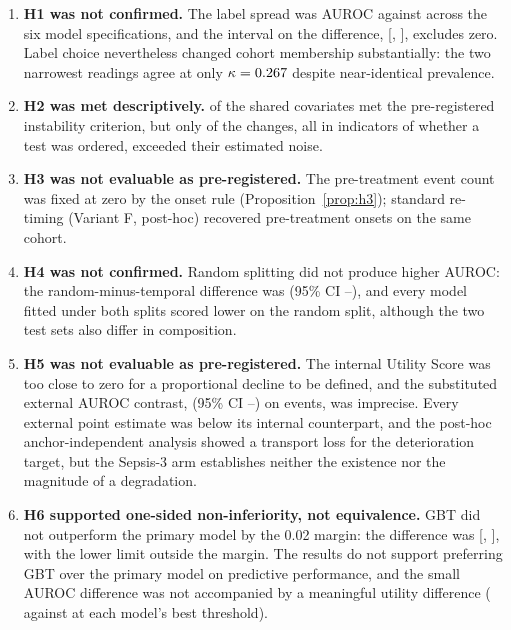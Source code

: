 \begin{enumerate}
    \item \textbf{H1 was not confirmed.} The label spread was
    \pcSpreadLabel{} AUROC against \pcSpreadModelClass{} across the six model
    specifications, and the interval on the difference,
    [\pcHOneCiLo, \pcHOneCiHi], excludes zero. Label choice nevertheless
    changed cohort membership substantially: the two narrowest readings agree
    at only $\kappa = 0.267$ despite near-identical prevalence.

    \item \textbf{H2 was met descriptively.} \pcHTwoEst{} of the
    \pcHTwoNTerms{} shared covariates met the pre-registered instability
    criterion, but only \pcHTwoNRobust{} of the changes, all in indicators of
    whether a test was ordered, exceeded their estimated noise.

    \item \textbf{H3 was not evaluable as pre-registered.} The pre-treatment
    event count was fixed at zero by the onset rule
    (Proposition~\ref{prop:h3}); standard re-timing (Variant F, post-hoc)
    recovered \pcPreTreatOnsetsVarF{} pre-treatment onsets on the same cohort.

    \item \textbf{H4 was not confirmed.} Random splitting did not produce
    higher AUROC: the random-minus-temporal difference was \pcHFourEst{}
    (95\% CI \pcHFourCiLo--\pcHFourCiHi), and every model fitted under both
    splits scored lower on the random split, although the two test sets also
    differ in composition.

    \item \textbf{H5 was not evaluable as pre-registered.} The internal Utility
    Score was too close to zero for a proportional decline to be defined, and
    the substituted external AUROC contrast, \pcHFiveEst{}
    (95\% CI \pcHFiveCiLo--\pcHFiveCiHi) on \pcExtNEventsB{} events, was
    imprecise. Every external point estimate was below its internal
    counterpart, and the post-hoc anchor-independent analysis showed a
    transport loss for the deterioration target, but the Sepsis-3 arm
    establishes neither the existence nor the magnitude of a degradation.

    \item \textbf{H6 supported one-sided non-inferiority, not equivalence.} GBT
    did not outperform the primary model by the 0.02 margin: the difference
    was \pcHSixEst{} [\pcHSixCiLo, \pcHSixCiHi], with the lower limit outside
    the margin. The results do not support preferring GBT over the primary
    model on predictive performance, and the small AUROC difference was not
    accompanied by a meaningful utility difference (\pcUtilityMaxGbtB{}
    against \pcUtilityMaxPrimaryB{} at each model's best threshold).
\end{enumerate}


